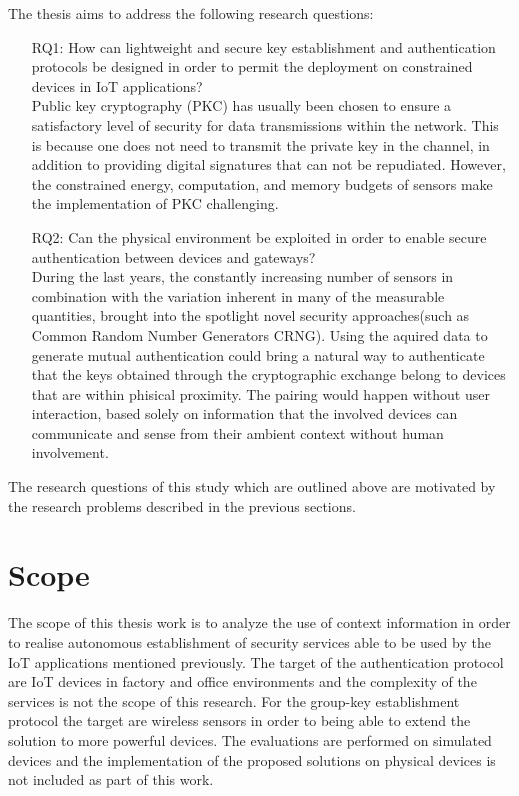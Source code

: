The thesis aims to address the following research questions:
\begin{itemize}
    \item[RQ1:] How can lightweight and secure key establishment and authentication protocols be designed in order to permit the deployment on constrained devices in IoT applications?\\Public  key  cryptography (\acs{PKC}) has usually been chosen to ensure a satisfactory level of  security  for  data  transmissions  within  the  network.  
    This is  because  one  does  not  need  to  transmit  the  private  key in  the  channel,  in  addition  to  providing  digital  signatures that can not be repudiated. 
    However, the constrained energy, computation,  and  memory  budgets  of  sensors  make  the implementation of PKC challenging.
    
    \item[RQ2:] Can the physical environment be exploited in order to enable secure authentication between devices and gateways?\\
    During the last years, the constantly increasing number of sensors in combination with the variation inherent in many of the measurable quantities, brought into the spotlight novel security approaches(such as Common Random Number Generators \acs{CRNG}). 
    Using the aquired data to generate mutual authentication could bring a natural way to authenticate that the keys obtained through the cryptographic exchange belong to devices that are within phisical proximity.
    The pairing would happen without user interaction, based solely on information that the involved devices can communicate and sense from their ambient context without human involvement.  
    
\end{itemize}
The research questions of this study which are outlined above are motivated by the research problems described in the previous sections.

\section{Scope}
\label{sec:scope}
The scope of this thesis work is to analyze the use of context information in order to  realise autonomous establishment of security services able to be used by the IoT applications mentioned previously.
The target of the authentication protocol are IoT devices in factory and office environments and the complexity of the services is not the scope of this research.
For the group-key establishment protocol the target are wireless sensors in order to being able to extend the solution to more powerful devices. 
The evaluations are performed on simulated devices and the implementation of the proposed solutions on physical devices is not included as part of this work.


